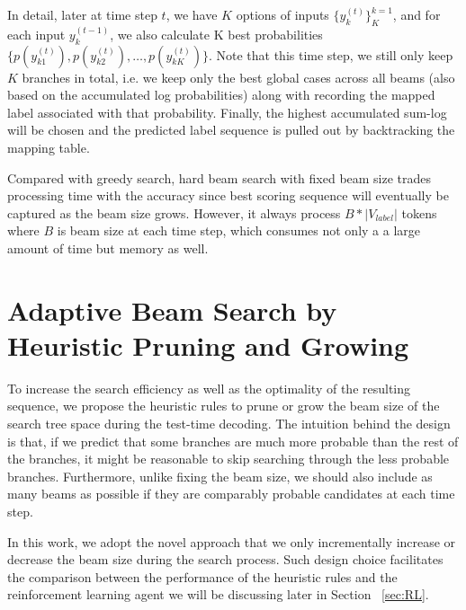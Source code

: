 \documentclass[11pt,a4paper]{article}
\begin{document}
In detail, later at time step $t$, we have $K$ options of inputs $\{ y^{(t)}_k\}^{k=1}_K$, and for each input $y^{(t-1)}_{k}$, we also calculate K best probabilities $\{ p({y}^{(t)}_{k1}), p({y}^{(t)}_{k2}), \dots, p({y}^{(t)}_{kK}) \}$. Note that this time step, we still only keep $K$ branches in total, i.e. we keep only the best global cases across all beams (also based on the accumulated log probabilities) along with recording the mapped label associated with that probability. Finally, the highest accumulated sum-log will be chosen and the predicted label sequence is pulled out by backtracking the mapping table. 

Compared with greedy search, hard beam search with fixed beam size trades processing time with the accuracy since best scoring sequence will eventually be captured as the beam size grows. However, it always process $B * |V_{label}|$ tokens where $B$ is beam size at each time step, which consumes not only a a large amount of time but memory as well. 


\section{Adaptive Beam Search by Heuristic Pruning and Growing}
\label{sec:Heuristic}

To increase the search efficiency as well as the optimality of the resulting sequence, we propose the heuristic rules to prune or grow the beam size of the search tree space during the test-time decoding. The intuition behind the design is that, if we predict that some branches are much more probable than the rest of the branches, it might be reasonable to skip searching through the less probable branches. Furthermore, unlike fixing the beam size, we should also include as many beams as possible if they are comparably probable candidates at each time step.

In this work, we adopt the novel approach that we only incrementally increase or decrease the beam size during the search process. Such design choice facilitates the comparison between the performance of the heuristic rules and the reinforcement learning agent we will be discussing later in Section ~\ref{sec:RL}.
\end{document}
